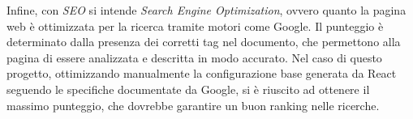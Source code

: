     Infine, con \emph{SEO} si intende \emph{\emph{S}earch \emph{E}ngine \emph{O}ptimization}, ovvero quanto la pagina web è ottimizzata per la ricerca tramite motori come Google.
    Il punteggio è determinato dalla presenza dei corretti tag nel documento, che permettono alla pagina di essere analizzata e descritta in modo accurato.
    Nel caso di questo progetto, ottimizzando manualmente la configurazione base generata da React seguendo le specifiche documentate da Google, si è riuscito ad ottenere il massimo punteggio, che dovrebbe garantire un buon ranking nelle ricerche.








